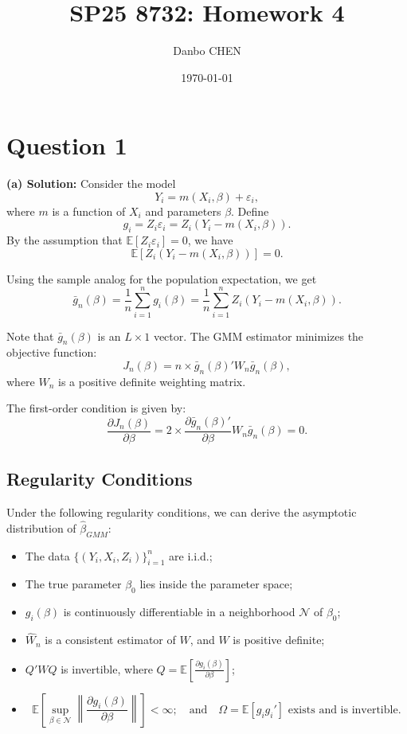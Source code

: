 \documentclass{article}
\title{SP25 8732: Homework 4}
\author{Danbo CHEN}
\date{\today}
\begin{document}
\maketitle
\vspace{.25in}

\section{Question 1}
\textbf{(a) Solution:}
Consider the model 
\[
Y_i = m(X_i, \beta) + \varepsilon_i,
\]
where \( m \) is a function of \( X_i \) and parameters \( \beta \). Define 
\[
g_i = Z_i \varepsilon_i = Z_i \left(Y_i - m(X_i, \beta) \right).
\]
By the assumption that \( \mathbb{E}[Z_i \varepsilon_i] = 0 \), we have 
\[
\mathbb{E}[Z_i (Y_i - m(X_i, \beta))] = 0.
\]

\noindent
Using the sample analog for the population expectation, we get
\[
\bar{g}_n(\beta) = \frac{1}{n} \sum_{i=1}^n g_i(\beta) = \frac{1}{n} \sum_{i=1}^n Z_i \left(Y_i - m(X_i, \beta) \right).
\]

\noindent
Note that \( \bar{g}_n(\beta) \) is an \( L \times 1 \) vector. The GMM estimator minimizes the objective function:
\[
J_n(\beta) = n \times \bar{g}_n(\beta)' W_n \bar{g}_n(\beta),
\]
where \( W_n \) is a positive definite weighting matrix.

\noindent
The first-order condition is given by:
\[
\frac{\partial J_n(\beta)}{\partial \beta} = 2 \times \frac{\partial \bar{g}_n(\beta)'}{\partial \beta} W_n \bar{g}_n(\beta) = 0.
\]

\subsection*{Regularity Conditions}

Under the following regularity conditions, we can derive the asymptotic distribution of \( \hat{\beta}_{GMM} \):
\begin{itemize}[leftmargin=1.5em]
    \item The data \(\{(Y_i, X_i, Z_i)\}_{i=1}^n\) are i.i.d.;
    \item The true parameter \( \beta_0 \) lies inside the parameter space;
    \item \( g_i(\beta) \) is continuously differentiable in a neighborhood \( \mathcal{N} \) of \( \beta_0 \);
    \item \( \hat{W}_n \) is a consistent estimator of \( W \), and \( W \) is positive definite;
    \item \( Q'WQ \) is invertible, where \( Q = \mathbb{E} \left[\frac{\partial g_i(\beta)}{\partial \beta} \right] \);
    \item 
    \[
    \mathbb{E} \left[\sup_{\beta \in \mathcal{N}} \left\| \frac{\partial g_i(\beta)}{\partial \beta} \right\| \right] < \infty;
    \quad \text{and} \quad \Omega = \mathbb{E}[g_i g_i'] \text{ exists and is invertible}.
    \]
\end{itemize}
\end{document}
